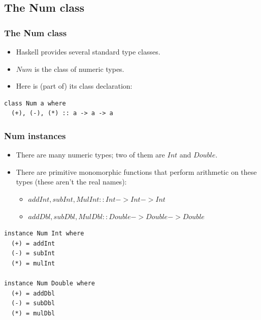 \documentclass{beamer}
\begin{document}
\subsection{The Num class}

\begin{frame}[fragile]
\frametitle{The Num class}

\begin{itemize}
\item Haskell provides several standard type classes.
\item $Num$ is the class of numeric types.
\item Here is (part of) its class declaration:
\end{itemize}

\begin{verbatim}
class Num a where
  (+), (-), (*) :: a -> a -> a
\end{verbatim}

\end{frame}

\begin{frame}[fragile]
\frametitle{Num instances}

\begin{itemize}
\item There are many numeric types; two of them are $Int$ and
  $Double$.
\item There are primitive monomorphic functions that perform
  arithmetic on these types (these aren't the real names):
  \begin{itemize}
  \item $addInt, subInt, MulInt :: Int -> Int -> Int$
  \item $addDbl, subDbl, MulDbl :: Double -> Double -> Double$
  \end{itemize}
\end{itemize}

\begin{verbatim}
instance Num Int where
  (+) = addInt
  (-) = subInt
  (*) = mulInt

instance Num Double where
  (+) = addDbl
  (-) = subDbl
  (*) = mulDbl
\end{verbatim}

\end{frame}
\end{document}
